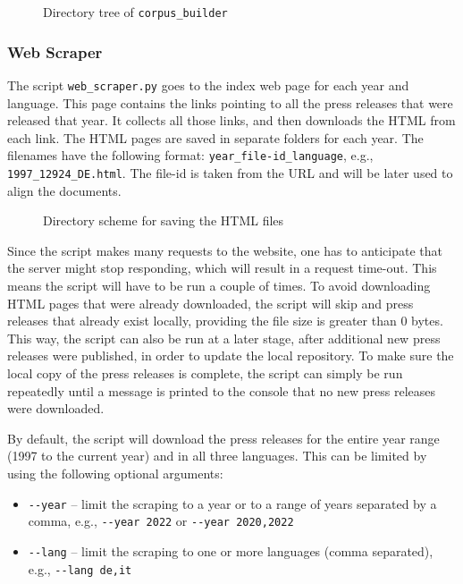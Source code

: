 \begin{figure}

\caption{Directory tree of \texttt{corpus\_builder}}
\end{figure} 
\subsubsection{Web Scraper}
\label{subsubsec:web-scraper}
The script \texttt{web\_scraper.py} goes to the index web page for each year and language. 
This page contains the links pointing to all the press releases that were released that year. 
It collects all those links, and then downloads the HTML from each link. 
The HTML pages are saved in separate folders for each year. 
The filenames have the following format: \texttt{year\_file-id\_language}, e.g., \texttt{1997\_12924\_DE.html}. 
The file-id is taken from the URL and will be later used to align the documents. 


\begin{figure}[ht]
\caption{Directory scheme for saving the HTML files}
\label{fig:html-scheme}
\end{figure} 

Since the script makes many requests to the website, one has to anticipate that the server might stop responding, which will result in a request time-out.  This means the script will have to be run a couple of times.
To avoid downloading HTML pages that were already downloaded, the script will skip and press releases that already exist locally, providing the file size is greater than 0 bytes.
This way, the script can also be run at a later stage, after additional new press releases were published, in order to update the local repository.
To make sure the local copy of the press releases is complete, the script can simply be run repeatedly until a message is printed to the console that no new press releases were downloaded. 

By default, the script will download the press releases for the entire year range (1997 to the current year) and in all three languages. 
This can be limited by using the following optional arguments:
\begin{itemize}
	\item \texttt{-{}-year} -- limit the scraping to a year or to a range of years separated by a comma, e.g., \texttt{-{}-year 2022} or \texttt{-{}-year 2020,2022}
	\item \texttt{-{}-lang} -- limit the scraping to one or more languages (comma separated), e.g., \texttt{-{}-lang de,it}
\end{itemize}

